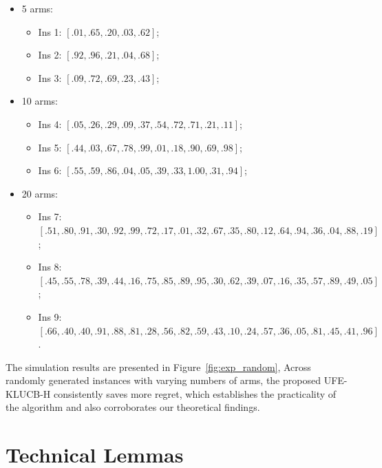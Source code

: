 \documentclass[twoside,11pt]{article}
\newcommand{\ouralg}{\textsc{UFE-KLUCB-H}}
\begin{document}
\begin{itemize}[leftmargin=1em,parsep=0.5pt]
    \item 5 arms: 
    \begin{itemize}[leftmargin=1em,parsep=0.5pt]
        \item Ins 1: $[.01, .65, .20, .03, .62]$;
    	\item Ins 2: $[.92,.96,.21,.04,.68]$;
    	\item Ins 3: $[.09,.72,.69,.23,.43]$;
    \end{itemize}
    	
    \item 10 arms: 
    \begin{itemize}[leftmargin=1em,parsep=0.5pt]
        \item Ins 4: $[.05,.26,.29,.09,.37,.54,.72,.71,.21,.11]$;
    	\item Ins 5: $[.44,.03,.67,.78,.99,.01,.18,.90,.69,.98]$;
    	\item Ins 6: $[.55,.59,.86,.04,.05,.39,.33,1.00,.31,.94]$;
    \end{itemize}
    	
    \item 20 arms:
    \begin{itemize}[leftmargin=1em,parsep=0.5pt]
        \item Ins 7: $[.51,.80,.91,.30,.92,.99,.72,.17,.01,.32,.67,.35,.80,.12,.64,.94,.36,.04,.88,.19]$;
    	\item Ins 8: $[.45,.55,.78,.39,.44,.16,.75,.85,.89,.95,.30,.62,.39,.07,.16,.35,.57,.89,.49,.05]$;
    	\item Ins 9: $[.66,.40,.40,.91,.88,.81,.28,.56,.82,.59,.43,.10,.24,.57,.36,.05,.81,.45,.41,.96]$.
    \end{itemize}
\end{itemize}

The simulation results are presented in Figure~\ref{fig:exp_random},
Across randomly generated instances with varying numbers of arms, the proposed \ouralg{} consistently saves more regret, which establishes the practicality of the algorithm and also corroborates our theoretical findings.

\section{Technical Lemmas}\label{app:tech_lem}
\end{document}
